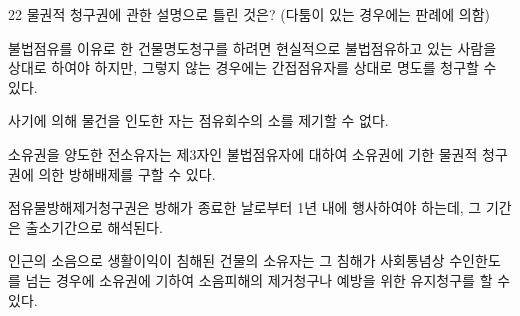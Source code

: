 \begin{question}{22}
물권적 청구권에 관한 설명으로 틀린 것은? (다툼이 있는 경우에는 판례에 의함)
\begin{choices}
  \item 불법점유를 이유로 한 건물명도청구를 하려면 현실적으로 불법점유하고 있는 사람을 상대로 하여야 하지만, 그렇지 않는 경우에는 간접점유자를 상대로 명도를 청구할 수 있다.
  \item 사기에 의해 물건을 인도한 자는 점유회수의 소를 제기할 수 없다.
  \item 소유권을 양도한 전소유자는 제3자인 불법점유자에 대하여 소유권에 기한 물권적 청구권에 의한 방해배제를 구할 수 있다.
  \item 점유물방해제거청구권은 방해가 종료한 날로부터 1년 내에 행사하여야 하는데, 그 기간은 출소기간으로 해석된다.
  \item 인근의 소음으로 생활이익이 침해된 건물의 소유자는 그 침해가 사회통념상 수인한도를 넘는 경우에 소유권에 기하여 소음피해의 제거청구나 예방을 위한 유지청구를 할 수 있다.
\end{choices}
\end{question}
